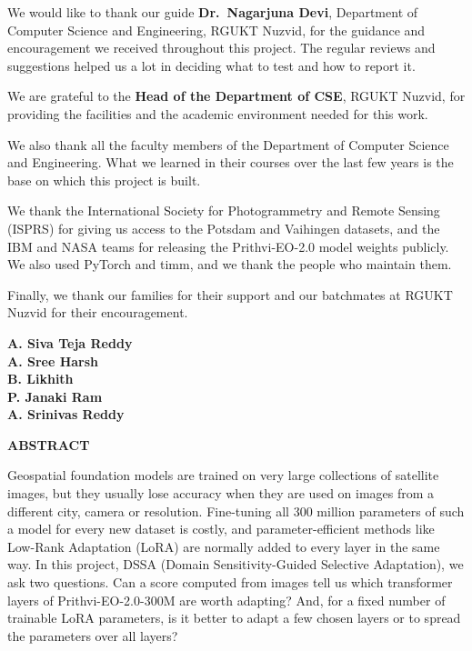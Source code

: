 \documentclass[11pt,a4paper]{report}
\newif\ifblankpage
\newcommand{\blankpage}{%
  \clearpage\blankpagetrue\thispagestyle{empty}\null\clearpage
  \blankpagefalse\addtocounter{page}{-1}}
\begin{document}
\vspace{0.5cm}
We would like to thank our guide \textbf{Dr.~Nagarjuna Devi}, Department of Computer Science and Engineering, RGUKT Nuzvid, for the guidance and encouragement we received throughout this project. The regular reviews and suggestions helped us a lot in deciding what to test and how to report it.

We are grateful to the \textbf{Head of the Department of CSE}, RGUKT Nuzvid, for providing the facilities and the academic environment needed for this work.

We also thank all the faculty members of the Department of Computer Science and Engineering. What we learned in their courses over the last few years is the base on which this project is built.

We thank the International Society for Photogrammetry and Remote Sensing (ISPRS) for giving us access to the Potsdam and Vaihingen datasets, and the IBM and NASA teams for releasing the Prithvi-EO-2.0 model weights publicly. We also used PyTorch and timm, and we thank the people who maintain them.

Finally, we thank our families for their support and our batchmates at RGUKT Nuzvid for their encouragement.

\vspace{1.5cm}
\begin{flushright}
\textbf{A. Siva Teja Reddy}\\
\textbf{A. Sree Harsh}\\
\textbf{B. Likhith}\\
\textbf{P. Janaki Ram}\\
\textbf{A. Srinivas Reddy}
\end{flushright}

\blankpage

\begin{center}
\textbf{\Large ABSTRACT}
\end{center}

\vspace{0.5cm}
Geospatial foundation models are trained on very large collections of satellite images, but they usually lose accuracy when they are used on images from a different city, camera or resolution. Fine-tuning all 300 million parameters of such a model for every new dataset is costly, and parameter-efficient methods like Low-Rank Adaptation (LoRA) are normally added to every layer in the same way. In this project, DSSA (Domain Sensitivity-Guided Selective Adaptation), we ask two questions. Can a score computed from images tell us which transformer layers of Prithvi-EO-2.0-300M are worth adapting? And, for a fixed number of trainable LoRA parameters, is it better to adapt a few chosen layers or to spread the parameters over all layers?
\end{document}
